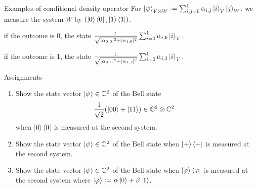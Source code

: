 \documentclass[10pt]{beamer}
\begin{document}
\begin{frame}{Examples of conditional density operator}
For $\ket{\psi}_{V\otimes W} := \sum_{i,j=0}^1 \alpha_{i,j}\ket{i}_V\ket{j}_W$, we measure the system $W$ by $(\ket{0}\bra{0},\ket{1}\bra{1})$.

\vspace{2em}
if the outcome is 0, the state $\frac1{\sqrt{|\alpha_{0,0}|^2+|\alpha_{1,0}|^2}}\sum_{i=0}^1 \alpha_{i,0}\ket{i}_V$.

\vspace{2em}
if the outcome is 1, the state $\frac1{\sqrt{|\alpha_{0,1}|^2+|\alpha_{1,1}|^2}}\sum_{i=0}^1 \alpha_{i,1}\ket{i}_V$.
\end{frame}

\begin{frame}{Assignments}
\begin{enumerate}
\setlength{\itemsep}{2em}
\item Show the state vector $\ket{\psi}\in \mathbb{C}^2$ of the Bell state
\begin{equation*}
\frac1{\sqrt{2}}(\ket{00}+\ket{11}) \in \mathbb{C}^2\otimes \mathbb{C}^2
\end{equation*}
when $\ket{0}\bra{0}$ is measured at the second system.
\item Show the state vector $\ket{\psi}\in \mathbb{C}^2$ of the Bell state
when $\ket{+}\bra{+}$ is measured at the second system.
\item Show the state vector $\ket{\psi}\in \mathbb{C}^2$ of the Bell state
when $\ket{\varphi}\bra{\varphi}$ is measured at the second system where $\ket{\varphi}:=\alpha\ket{0}+\beta\ket{1}$.
\end{enumerate}
\end{frame}
\end{document}
